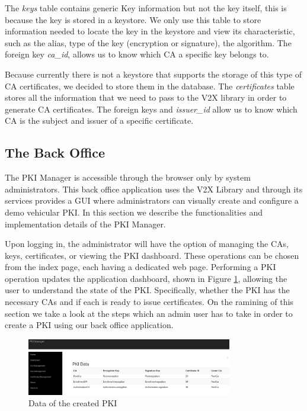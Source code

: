 The \textit{keys} table contains generic Key information but not the key itself, this is because the key is stored in a keystore. We only use this table to store information needed to locate the key in the keystore and view its characteristic, such as the alias, type of the key (encryption or signature), the algorithm. The foreign key \textit{ca\_id}, allows us to know which CA a specific key belongs to. 

Because currently there is not a keystore that supports the storage of this type of CA certificates, we decided to store them in the database. The \textit{certificates} table stores all the information that we need to pass to the V2X library in order to generate CA certificates. The foreign keys  and \textit{issuer\_id} allow us to know which CA is the subject and issuer of a specific certificate. 


\subsection{The Back Office}
The PKI Manager is accessible through the browser only by system administrators. This back office application uses the V2X Library and through its services provides a GUI where administrators can visually create and configure a demo vehicular PKI. In this section we describe the functionalities and implementation details of the PKI Manager.

Upon logging in, the administrator will have the option of managing the CAs, keys, certificates, or viewing the PKI dashboard. These operations can be chosen from the index page, each having a dedicated web page. Performing a PKI operation updates the application dashboard, shown in Figure \ref{fig:manager10}, allowing the user to understand the state of the PKI. Specifically, whether the PKI has the necessary CAs and if each is ready to issue certificates. On the ramining of this section we take a look at the steps which an admin user has to take in order to create a PKI using our back office application.

\begin{figure}[!h]
	\centering
	\includegraphics[width=0.8\textwidth]{Figures/manager10}
	\caption{\label{fig:manager10} Data of the created PKI}
\end{figure}

